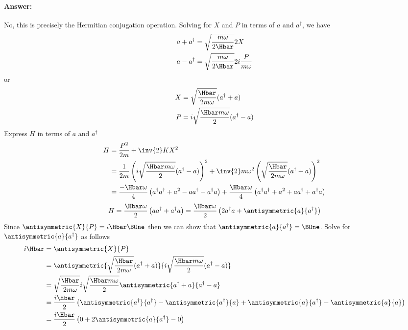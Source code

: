 \paragraph{Answer:} No, this is precisely the Hermitian conjugation operation.
%
Solving for \(X\) and \(P\) in terms of \(a\) and \(a^\dagger\), we have
%
\begin{equation}\label{eqn:lecture11harmonicOscillator:620}
\begin{aligned}
a + a^\dagger &= \sqrt{\frac{m \omega}{2 \Hbar}} 2 X  \\
a - a^\dagger &= \sqrt{\frac{m \omega}{2 \Hbar}} 2 i \frac{P }{m \omega}
\end{aligned}
\end{equation}
%
or
\begin{equation}\label{eqn:PHY356FLecture11:30}
\begin{aligned}
X &= \sqrt{\frac{\Hbar}{2 m \omega}} (a^\dagger + a) \\
P &= i \sqrt{\frac{\Hbar m \omega}{2}} (a^\dagger -a)
\end{aligned}
\end{equation}
%
Express \(H\) in terms of \(a\) and \(a^\dagger\)
%
\begin{equation}\label{eqn:lecture11harmonicOscillator:640}
\begin{aligned}
H
&= \frac{P^2}{2m} + \inv{2} K X^2  \\
&=
\frac{1}{2m} \left(
i \sqrt{\frac{\Hbar m \omega}{2}} (a^\dagger -a)
\right)^2
+ \inv{2} m \omega^2
\left(
\sqrt{\frac{\Hbar}{2 m \omega}} (a^\dagger + a)
\right)^2 \\
&=
\frac{-\Hbar \omega}{4} \left(
a^\dagger a^\dagger + a^2 - a a^\dagger - a^\dagger a
\right)
+ \frac{\Hbar \omega}{4}
\left(
a^\dagger a^\dagger + a^2 + a a^\dagger + a^\dagger a
\right) \\
\end{aligned}
\end{equation}
%
\begin{equation}\label{eqn:PHY356FLecture11:66}
H
=
\frac{\Hbar \omega}{2} \left(
a a^\dagger + a^\dagger a
\right)
=
\frac{\Hbar \omega}{2} \left(
2 a^\dagger a + \antisymmetric{a}{a^\dagger}
\right)
\end{equation}
%
Since \(\antisymmetric{X}{P} = i \Hbar \BOne\) then we can show that \(\antisymmetric{a}{a^\dagger} = \BOne\).  Solve for \(\antisymmetric{a}{a^\dagger}\) as follows
%
\begin{equation}\label{eqn:lecture11harmonicOscillator:660}
\begin{aligned}
i \Hbar
&=
\antisymmetric{X}{P} \\
&=
\antisymmetric{\sqrt{\frac{\Hbar}{2 m \omega}} (a^\dagger + a) }{i \sqrt{\frac{\Hbar m \omega}{2}} (a^\dagger -a)} \\
&=
\sqrt{\frac{\Hbar}{2 m \omega}} i \sqrt{\frac{\Hbar m \omega}{2}}
\antisymmetric{a^\dagger + a}{a^\dagger -a} \\
&= \frac{i \Hbar}{2}
\left(
\antisymmetric{a^\dagger}{a^\dagger}
-\antisymmetric{a^\dagger}{a}
+\antisymmetric{a}{a^\dagger}
-\antisymmetric{a}{a} \right)  \\
&= \frac{i \Hbar}{2}
\left(
0
+2 \antisymmetric{a}{a^\dagger}
-0
\right)
\end{aligned}
\end{equation}

